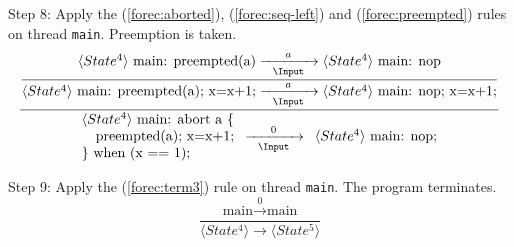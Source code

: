 \noindent
Step 8: Apply the (\ref{forec:aborted}), (\ref{forec:seq-left}) and 
(\ref{forec:preempted}) rules on thread \verb$main$. Preemption is taken.
\begin{equation*}
	\frac{
		\dfrac{
				\langle State^4 \rangle ~ \text{main: preempted(a)}
					\xrightarrow[~~\Input~~]{a} 
				\langle State^4 \rangle ~ \text{main: nop}
			}{
				\langle State^4 \rangle ~ \text{main: preempted(a); x=x+1;}					
					\xrightarrow[~~\Input~~]{a} 
				\langle State^4 \rangle ~ \text{main: nop; x=x+1;}				
			}
		}{
			\begin{array}{l}
				\langle State^4 \rangle ~ \text{main: abort a \{}	\\
				\text{~~~preempted(a); x=x+1;}						\\
				\text{\} when (x == 1);}							
			\end{array}
				\xrightarrow[~~\Input~~]{0} 
			\begin{array}{l}
				\langle State^4 \rangle ~ \text{main: nop;}
			\end{array}
		}
\end{equation*}

\noindent
Step 9: Apply the (\ref{forec:term3}) rule on thread \verb$main$.
The program terminates.
\begin{equation*}
	\frac{
			\text{main} \xrightarrow{~~0~~} \text{main}
		}{
			\langle State^4 \rangle \xrightarrow{~~~~~} \langle State^5 \rangle
		}
\end{equation*}


